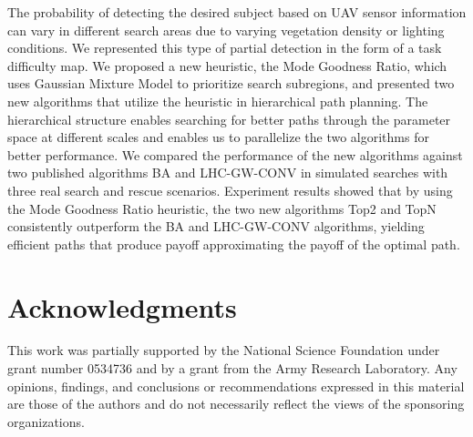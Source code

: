\documentclass[journal]{IEEEtran}
\begin{document}
The probability of detecting the desired subject based on UAV sensor information can vary in different search areas due to varying vegetation density or lighting conditions. We represented this type of partial detection in the form of a task difficulty map. We proposed a new heuristic, the Mode Goodness Ratio, which uses Gaussian Mixture Model to prioritize search subregions, and presented two new algorithms that utilize the heuristic in hierarchical path planning. The hierarchical structure enables searching for better paths through the parameter space at different scales and enables us to parallelize the two algorithms for better performance. We compared the performance of the new algorithms against two published algorithms BA and LHC-GW-CONV in simulated searches with three real search and rescue scenarios. Experiment results showed that by using the Mode Goodness Ratio heuristic, the two new algorithms Top2 and TopN consistently outperform the BA and LHC-GW-CONV algorithms, yielding efficient paths that produce payoff approximating the payoff of the optimal path.  


\section*{Acknowledgments}

This work was partially supported by 
the National Science Foundation 
under grant number 
0534736 
and by a grant from
the Army Research Laboratory.
Any opinions, findings, and conclusions or recommendations expressed in this material are those of the authors and do not necessarily reflect the views of the sponsoring organizations.




\end{document}
